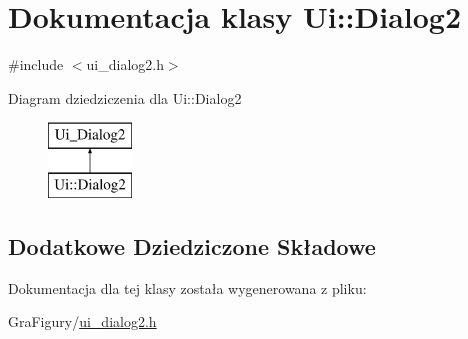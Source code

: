 \hypertarget{classUi_1_1Dialog2}{\section{Dokumentacja klasy Ui\-:\-:Dialog2}
\label{classUi_1_1Dialog2}
}


{\ttfamily \#include $<$ui\-\_\-dialog2.\-h$>$}

Diagram dziedziczenia dla Ui\-:\-:Dialog2\begin{figure}[H]
\begin{center}
\leavevmode
\includegraphics[height=2.000000cm]{dd/d3c/classUi_1_1Dialog2}
\end{center}
\end{figure}
\subsection*{Dodatkowe Dziedziczone Składowe}


Dokumentacja dla tej klasy została wygenerowana z pliku\-:\begin{DoxyCompactItemize}
\item 
Gra\-Figury/\hyperlink{ui__dialog2_8h}{ui\-\_\-dialog2.\-h}\end{DoxyCompactItemize}
